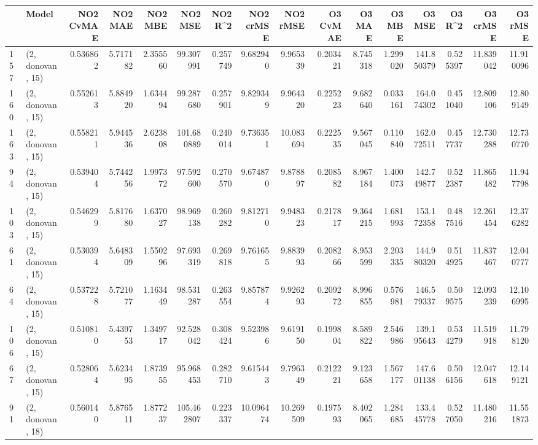 \begin{tabular}{llrrrrrrrrrrrrrr}
\toprule
{} &             Model &  NO2 CvMAE &    NO2 MAE &   NO2 MBE &     NO2 MSE &   NO2 R\textasciicircum 2 &  NO2 crMSE &   NO2 rMSE &  O3 CvMAE &     O3 MAE &     O3 MBE &      O3 MSE &    O3 R\textasciicircum 2 &   O3 crMSE &    O3 rMSE \\
\midrule
157 &  (2, donovan, 15) &   0.536862 &   5.717182 &  2.355560 &   99.307991 &  0.257749 &   9.682940 &   9.965339 &  0.203421 &   8.745318 &   1.299020 &  141.850379 &  0.525397 &  11.839042 &  11.910096 \\
160 &  (2, donovan, 15) &   0.552613 &   5.884920 &  1.634494 &   99.287680 &  0.257901 &   9.829349 &   9.964320 &  0.225223 &   9.682640 &   0.033161 &  164.074302 &  0.451040 &  12.809106 &  12.809149 \\
163 &  (2, donovan, 15) &   0.558211 &   5.944536 &  2.623808 &  101.680889 &  0.240014 &   9.736351 &  10.083694 &  0.222535 &   9.567045 &   0.110840 &  162.072511 &  0.457737 &  12.730288 &  12.730770 \\
94  &  (2, donovan, 15) &   0.539404 &   5.744256 &  1.997372 &   97.592600 &  0.270570 &   9.674870 &   9.878897 &  0.208582 &   8.967184 &   1.400073 &  142.749877 &  0.522387 &  11.865482 &  11.947798 \\
103 &  (2, donovan, 15) &   0.546299 &   5.817680 &  1.637027 &   98.969138 &  0.260282 &   9.812710 &   9.948323 &  0.217817 &   9.364215 &   1.681993 &  153.172358 &  0.487516 &  12.261454 &  12.376282 \\
61  &  (2, donovan, 15) &   0.530394 &   5.648309 &  1.550296 &   97.693319 &  0.269818 &   9.761655 &   9.883993 &  0.208266 &   8.953599 &   2.203335 &  144.980320 &  0.514925 &  11.837467 &  12.040777 \\
64  &  (2, donovan, 15) &   0.537228 &   5.721077 &  1.163449 &   98.531287 &  0.263554 &   9.857874 &   9.926293 &  0.209272 &   8.996855 &   0.576981 &  146.579337 &  0.509575 &  12.093239 &  12.106995 \\
106 &  (2, donovan, 15) &   0.510810 &   5.439753 &  1.349717 &   92.528042 &  0.308424 &   9.523986 &   9.619150 &  0.199804 &   8.589822 &   2.546986 &  139.195643 &  0.534279 &  11.519918 &  11.798120 \\
67  &  (2, donovan, 15) &   0.528064 &   5.623495 &  1.873955 &   95.968453 &  0.282710 &   9.615443 &   9.796349 &  0.212221 &   9.123658 &   1.567177 &  147.601138 &  0.506156 &  12.047618 &  12.149121 \\
91  &  (2, donovan, 18) &   0.560140 &   5.876511 &  1.877237 &  105.462807 &  0.223337 &  10.096474 &  10.269509 &  0.197593 &   8.402065 &   1.284685 &  133.445778 &  0.527050 &  11.480216 &  11.551873 \\

\end{tabular}
